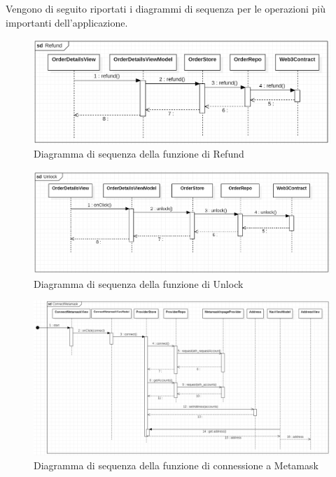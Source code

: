 Vengono di seguito riportati i diagrammi di sequenza per le operazioni più importanti dell'applicazione.

\begin{figure}[H]
    \begin{center}
    \includegraphics[width=\textwidth]{immagini/refund.png}
    \caption{Diagramma di sequenza della funzione di Refund}
    \end{center}
\end{figure}

\begin{figure}[H]
    \begin{center}
    \includegraphics[width=\textwidth]{immagini/unlock.png}
    \caption{Diagramma di sequenza della funzione di Unlock}
    \end{center}
\end{figure}

\begin{landscape}
    \begin{figure}[H]
        \begin{center}
        \includegraphics[scale=0.7]{immagini/connect_metamask.png}
        \caption{Diagramma di sequenza della funzione di connessione a Metamask}
        \end{center}
    \end{figure}
\end{landscape}

